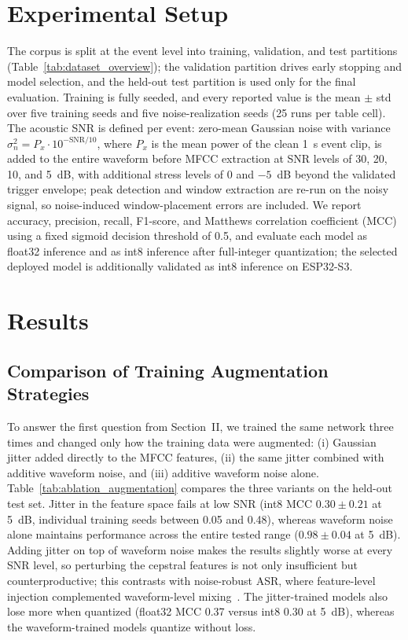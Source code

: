 ﻿\documentclass[conference]{IEEEtran}
\begin{document}
\section{Experimental Setup}
The corpus is split at the event level into training, validation, and test partitions (Table~\ref{tab:dataset_overview}); the validation partition drives early stopping and model selection, and the held-out test partition is used only for the final evaluation. Training is fully seeded, and every reported value is the mean $\pm$ std over five training seeds and five noise-realization seeds (25 runs per table cell). The acoustic SNR is defined per event: zero-mean Gaussian noise with variance $\sigma_n^2 = P_x \cdot 10^{-\mathrm{SNR}/10}$, where $P_x$ is the mean power of the clean 1~s event clip, is added to the entire waveform before MFCC extraction at SNR levels of 30, 20, 10, and 5~dB, with additional stress levels of 0 and $-5$~dB beyond the validated trigger envelope; peak detection and window extraction are re-run on the noisy signal, so noise-induced window-placement errors are included. We report accuracy, precision, recall, F1-score, and Matthews correlation coefficient (MCC) using a fixed sigmoid decision threshold of 0.5, and evaluate each model as float32 inference and as int8 inference after full-integer quantization; the selected deployed model is additionally validated as int8 inference on ESP32-S3.

\section{Results}
\subsection{Comparison of Training Augmentation Strategies}
To answer the first question from Section~II, we trained the same network three times and changed only how the training data were augmented: (i) Gaussian jitter added directly to the MFCC features, (ii) the same jitter combined with additive waveform noise, and (iii) additive waveform noise alone. Table~\ref{tab:ablation_augmentation} compares the three variants on the held-out test set. Jitter in the feature space fails at low SNR (int8 MCC $0.30 \pm 0.21$ at 5~dB, individual training seeds between 0.05 and 0.48), whereas waveform noise alone maintains performance across the entire tested range ($0.98 \pm 0.04$ at 5~dB). Adding jitter on top of waveform noise makes the results slightly worse at every SNR level, so perturbing the cepstral features is not only insufficient but counterproductive; this contrasts with noise-robust ASR, where feature-level injection complemented waveform-level mixing~\cite{braun2017accan}. The jitter-trained models also lose more when quantized (float32 MCC 0.37 versus int8 0.30 at 5~dB), whereas the waveform-trained models quantize without loss.
\end{document}
